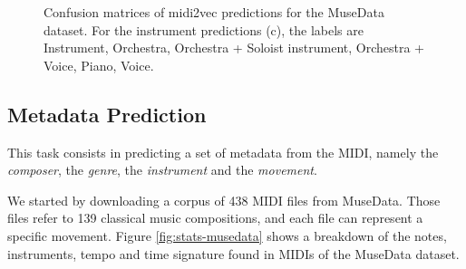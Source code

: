\documentclass{article}
\begin{document}
\begin{figure}[ht!]
\caption{Confusion matrices of midi2vec predictions for the MuseData dataset. For the instrument predictions (c), the labels are Instrument,  Orchestra, Orchestra + Soloist instrument, Orchestra + Voice, Piano, Voice.} \label{fig:cm-doremus}
\end{figure}

\subsection{Metadata Prediction}
\label{sec:metadata-pred}
This task consists in predicting a set of metadata from the MIDI, namely the \textit{composer}, the \textit{genre}, the \textit{instrument} and the \textit{movement}.

We started by downloading a corpus of 438 MIDI files from MuseData. Those files refer to 139 classical music compositions, and each file can represent a specific movement. Figure \ref{fig:stats-musedata} shows a breakdown of the notes, instruments, tempo and time signature found in MIDIs of the MuseData dataset.
\end{document}
